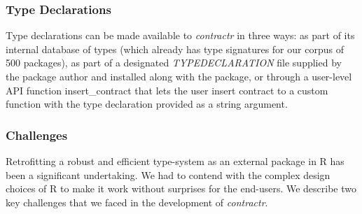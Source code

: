 \documentclass[acmsmall,review,anonymous]{acmart}\settopmatter{printfolios=true,printccs=false,printacmref=false}
\newcommand{\contractr}{\emph{contractr}\xspace} %
\begin{document}
%
%
\subsubsection{Type Declarations}
Type declarations can be made available to \contractr in three ways: as
part of its internal database of types (which already has type signatures for
our corpus of 500 packages), as part of a designated \emph{TYPEDECLARATION} file
supplied by the package author and installed along with the package, or through
a user-level API function insert\_contract that lets the user insert contract to
a custom function with the type declaration provided as a string argument.

%
%
\subsubsection{Challenges}
Retrofitting a robust and efficient type-system as an external package in R has
been a significant undertaking. We had to contend with the complex design
choices of R to make it work without surprises for the end-users. We describe
two key challenges that we faced in the development of \contractr.
\end{document}
